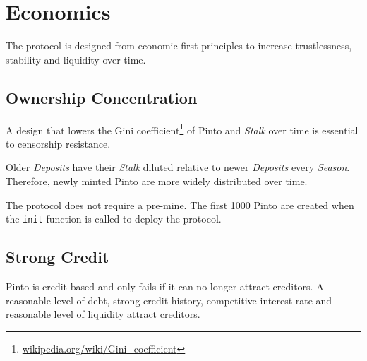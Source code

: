 \documentclass[tikz]{article}
\newcommand{\code}[1]{\texttt{#1}}
\newcommand{\term}[1]{\textsl{#1}}
\newcommand{\fref}[1]{\footnote{\href{http://#1}{#1}}}
\begin{document}

\vspace{0.1cm}
\section{Economics}
\vspace{0.1cm}

The protocol is designed from economic first principles to increase trustlessness, stability and liquidity over time.


\vspace{0.1cm}
\subsection{Ownership Concentration}
\vspace{0.1cm}

A design that lowers the Gini coefficient\fref{wikipedia.org/wiki/Gini\_coefficient} of Pinto and \term{Stalk} over time is essential to censorship resistance.

\vspace{0.1cm}

Older \term{Deposits} have their \term{Stalk} diluted relative to newer \term{Deposits} every \term{Season}. Therefore, newly minted Pinto are more widely distributed over time.

\vspace{0.1cm}

The protocol does not require a pre-mine. The first 1000 Pinto are created when the \code{init} function is called to deploy the protocol.


\vspace{0.1cm}
\subsection{Strong Credit}
\vspace{0.1cm}

Pinto is credit based and only fails if it can no longer attract creditors. A reasonable level of debt, strong credit history, competitive interest rate and reasonable level of liquidity attract creditors. 

\vspace{0.1cm}
\end{document}
